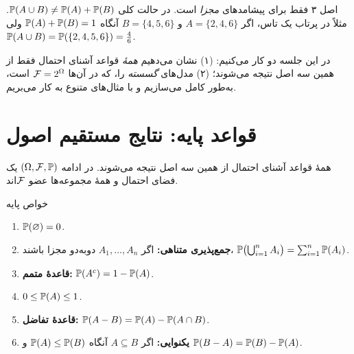 \begin{warning}
اصل ۳ فقط برای پیشامدهای \emph{مجزا} است. در حالت کلی $\P(A\cup B)\ne\P(A)+\P(B)$. مثلاً در پرتاب یک تاس، اگر $A=\{2,4,6\}$ و $B=\{4,5,6\}$ آنگاه $\P(A)+\P(B)=1$ ولی $\P(A\cup B)=\P(\{2,4,5,6\})=\tfrac46$.
\end{warning}

در این جلسه دو کار می‌کنیم: (۱) نشان می‌دهیم \emph{همهٔ} قواعد آشنای احتمال فقط از همین سه اصل نتیجه می‌شوند؛ (۲) مدل‌های \emph{گسسته} را، که در آن‌ها $\F=2^\Omega$ است، به‌طور کامل می‌سازیم و با مثال‌های متنوع به کار می‌بریم.

\section{قواعد پایه: نتایج مستقیم اصول}

همهٔ قواعد آشنای احتمال از همین سه اصل نتیجه می‌شوند. در ادامه $(\Omega,\F,\P)$ یک فضای احتمال و همهٔ مجموعه‌ها عضو $\F$اند.

\begin{theorem}[label=thm:basic-props]{خواص پایه}
\begin{enumerate}
  \item $\P(\varnothing)=0$.
  \item \textbf{جمع‌پذیری متناهی:} اگر $A_1,\dots,A_n$ دوبه‌دو مجزا باشند، $\P\bigl(\bigcup_{i=1}^nA_i\bigr)=\sum_{i=1}^n\P(A_i)$.
  \item \textbf{قاعدهٔ متمم:} $\P(A^c)=1-\P(A)$.
  \item $0\le\P(A)\le1$.
  \item \textbf{قاعدهٔ تفاضل:} $\P(A-B)=\P(A)-\P(A\cap B)$.
  \item \textbf{یکنوایی:} اگر $A\subseteq B$ آنگاه $\P(A)\le\P(B)$ و $\P(B-A)=\P(B)-\P(A)$.
\end{enumerate}
\end{theorem}

